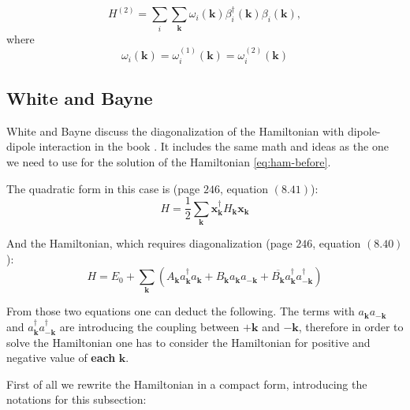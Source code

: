 \documentclass[a4paper,12pt]{article}
\begin{document}
            \begin{equation}
                H^{(2)} = \sum_{i}\sum_{\boldsymbol{k}}\omega_i(\boldsymbol{k})\beta^{\dag}_i(\boldsymbol{k})\beta_i(\boldsymbol{k}),
            \end{equation}
            where
            \begin{equation}
                \omega_i(\boldsymbol{k}) = \omega_i^{(1)}(\boldsymbol{k}) = \omega_i^{(2)}(\boldsymbol{k})
            \end{equation}

        \subsection{White and Bayne}\label{sec:white}
            White and Bayne discuss the diagonalization of the Hamiltonian with dipole-dipole interaction in the book \cite{white1983quantum}. 
            It includes the same math and ideas as the one we need to use for the solution of the Hamiltonian \eqref{eq:ham-before}.

            The quadratic form in this case is (page $246$, equation $(8.41)$):
            \begin{equation}
                H = \dfrac{1}{2} \sum_{\boldsymbol{k}} \boldsymbol{x}^{\dag}_{\boldsymbol{k}} H_{\boldsymbol{k}} \boldsymbol{x}_{\boldsymbol{k}} \label{eq:white-quadratic-form}
            \end{equation}

            And the Hamiltonian, which requires diagonalization (page $246$, equation $(8.40)$):
            \begin{equation}
                H = E_0 + \sum_{\boldsymbol{k}} \left(A_{\boldsymbol{k}}a^{\dag}_{\boldsymbol{k}}a_{\boldsymbol{k}} + 
                B_{\boldsymbol{k}}a_{\boldsymbol{k}}a_{-\boldsymbol{k}} + 
                \overline{B_{\boldsymbol{k}}}a^{\dag}_{\boldsymbol{k}}a^{\dag}_{-\boldsymbol{k}}\right)
            \end{equation}

            From those two equations one can deduct the following. The terms with $a_{\boldsymbol{k}}a_{-\boldsymbol{k}}$ 
            and $a^{\dag}_{\boldsymbol{k}}a^{\dag}_{-\boldsymbol{k}}$ are introducing the coupling between $+\boldsymbol{k}$ and $-\boldsymbol{k}$,
            therefore in order to solve the Hamiltonian one has to consider the Hamiltonian for positive and negative value of \textbf{each} $\boldsymbol{k}$.
            
            First of all we rewrite the Hamiltonian in a compact form, introducing the notations for this subsection:
\end{document}
